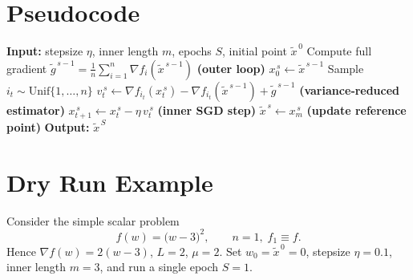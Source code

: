 \documentclass[11pt]{article}
\begin{document}
\section*{Pseudocode}
\begin{algorithm}[H]
\caption{SVRG (double‑loop)}\label{alg:svrg}
\begin{algorithmic}[1]
\STATE \textbf{Input:} stepsize $\eta$, inner length $m$, epochs $S$, initial point $\tilde{x}^{\,0}$
    \STATE Compute full gradient $\displaystyle \tilde{g}^{\,s-1}= \frac{1}{n}\sum_{i=1}^{n}\nabla f_i(\tilde{x}^{\,s-1})$ \hfill\textbf{(outer loop)}
    \STATE $x_0^{\,s}\gets \tilde{x}^{\,s-1}$
        \STATE Sample $i_t\sim \text{Unif}\{1,\dots,n\}$
        \STATE $v_t^{\,s}\gets \nabla f_{i_t}(x_t^{\,s})-\nabla f_{i_t}(\tilde{x}^{\,s-1})+\tilde{g}^{\,s-1}$ \hfill\textbf{(variance‑reduced estimator)}
        \STATE $x_{t+1}^{\,s}\gets x_t^{\,s}-\eta\, v_t^{\,s}$ \hfill\textbf{(inner SGD step)}
    \ENDFOR
    \STATE $\tilde{x}^{\,s}\gets x_{m}^{\,s}$ \hfill\textbf{(update reference point)}
\ENDFOR
\STATE \textbf{Output:} $\tilde{x}^{\,S}$
\end{algorithmic}
\end{algorithm}

\section*{Dry Run Example}
Consider the simple scalar problem
\[
f(w)=\bigl(w-3\bigr)^2,\qquad n=1,\; f_1\equiv f.
\]
Hence $\nabla f(w)=2(w-3)$, $L=2$, $\mu=2$.  
Set $w_0=\tilde{x}^{\,0}=0$, stepsize $\eta=0.1$, inner length $m=3$, and run a single epoch $S=1$.
\end{document}
